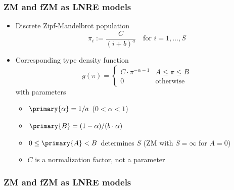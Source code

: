 \documentclass[t]{beamer} %
\begin{document}
\begin{frame}
  \frametitle{ZM and fZM as LNRE models}

  \begin{itemize}
  \item Discrete Zipf-Mandelbrot population
    \[
      \pi_i := \frac{C}{(i + b) ^ a} \quad \text{for } i = 1, \ldots, S
    \]
  \item<2-> Corresponding type density function \citep{Evert:04}
    \[
      g(\pi) =
      \begin{cases}
        C\cdot \pi^{-\alpha-1} & A \leq \pi \leq B\\
        0 & \text{otherwise}
      \end{cases}
    \]
    with parameters
    \begin{itemize}
    \item $\primary{\alpha} = 1 / a$ ($0 < \alpha < 1$)
    \item $\primary{B} = (1 - \alpha) / (b \cdot \alpha)$
    \item $0 \leq \primary{A} < B$ determines $S$ (ZM with $S = \infty$ for $A = 0$)
    \item[\hand] $C$ is a normalization factor, not a parameter
    \end{itemize}
  \end{itemize}
\end{frame}

\begin{frame}[c]
  \frametitle{ZM and fZM as LNRE models}

  \centering
\end{frame}
\end{document}
